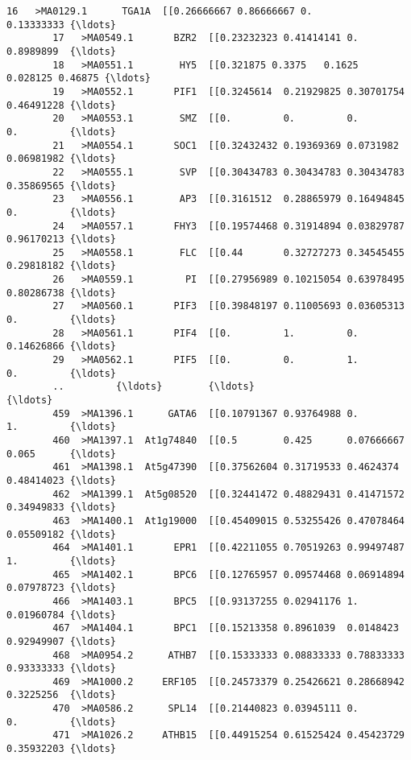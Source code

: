 \documentclass[11pt]{article}
\begin{document}
\begin{Verbatim}[commandchars=\\\{\}]
        16   >MA0129.1      TGA1A  [[0.26666667 0.86666667 0.         0.13333333 {\ldots}   
        17   >MA0549.1       BZR2  [[0.23232323 0.41414141 0.         0.8989899  {\ldots}   
        18   >MA0551.1        HY5  [[0.321875 0.3375   0.1625   0.028125 0.46875 {\ldots}   
        19   >MA0552.1       PIF1  [[0.3245614  0.21929825 0.30701754 0.46491228 {\ldots}   
        20   >MA0553.1        SMZ  [[0.         0.         0.         0.         {\ldots}   
        21   >MA0554.1       SOC1  [[0.32432432 0.19369369 0.0731982  0.06981982 {\ldots}   
        22   >MA0555.1        SVP  [[0.30434783 0.30434783 0.30434783 0.35869565 {\ldots}   
        23   >MA0556.1        AP3  [[0.3161512  0.28865979 0.16494845 0.         {\ldots}   
        24   >MA0557.1       FHY3  [[0.19574468 0.31914894 0.03829787 0.96170213 {\ldots}   
        25   >MA0558.1        FLC  [[0.44       0.32727273 0.34545455 0.29818182 {\ldots}   
        26   >MA0559.1         PI  [[0.27956989 0.10215054 0.63978495 0.80286738 {\ldots}   
        27   >MA0560.1       PIF3  [[0.39848197 0.11005693 0.03605313 0.         {\ldots}   
        28   >MA0561.1       PIF4  [[0.         1.         0.         0.14626866 {\ldots}   
        29   >MA0562.1       PIF5  [[0.         0.         1.         0.         {\ldots}   
        ..         {\ldots}        {\ldots}                                                {\ldots}   
        459  >MA1396.1      GATA6  [[0.10791367 0.93764988 0.         1.         {\ldots}   
        460  >MA1397.1  At1g74840  [[0.5        0.425      0.07666667 0.065      {\ldots}   
        461  >MA1398.1  At5g47390  [[0.37562604 0.31719533 0.4624374  0.48414023 {\ldots}   
        462  >MA1399.1  At5g08520  [[0.32441472 0.48829431 0.41471572 0.34949833 {\ldots}   
        463  >MA1400.1  At1g19000  [[0.45409015 0.53255426 0.47078464 0.05509182 {\ldots}   
        464  >MA1401.1       EPR1  [[0.42211055 0.70519263 0.99497487 1.         {\ldots}   
        465  >MA1402.1       BPC6  [[0.12765957 0.09574468 0.06914894 0.07978723 {\ldots}   
        466  >MA1403.1       BPC5  [[0.93137255 0.02941176 1.         0.01960784 {\ldots}   
        467  >MA1404.1       BPC1  [[0.15213358 0.8961039  0.0148423  0.92949907 {\ldots}   
        468  >MA0954.2      ATHB7  [[0.15333333 0.08833333 0.78833333 0.93333333 {\ldots}   
        469  >MA1000.2     ERF105  [[0.24573379 0.25426621 0.28668942 0.3225256  {\ldots}   
        470  >MA0586.2      SPL14  [[0.21440823 0.03945111 0.         0.         {\ldots}   
        471  >MA1026.2     ATHB15  [[0.44915254 0.61525424 0.45423729 0.35932203 {\ldots}   

\end{Verbatim}
\end{document}
